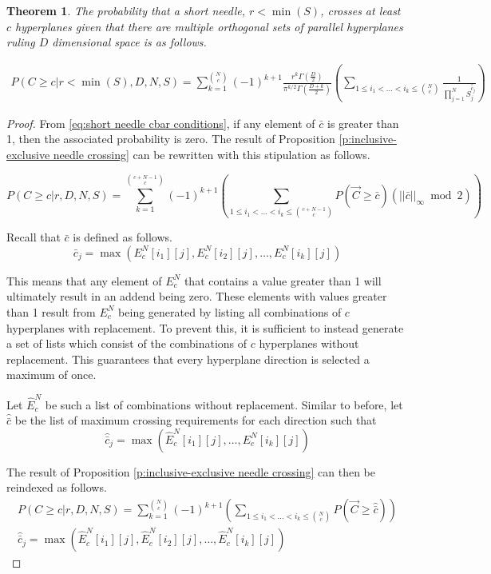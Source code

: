 \documentclass{article}
\newtheorem{theorem}{Theorem}
\begin{document}
\begin{theorem}
	The probability that a short needle, $r<\min(S)$, crosses at least $c$ hyperplanes given that there are 
	multiple orthogonal sets of parallel hyperplanes ruling $D$ dimensional space is as follows.

	\begin{gather}
		P(C\ge c|r<\min(S), D, N, S) = \sum_{k=1}^{N\choose c} (-1)^{k+1} \frac{r^k\Gamma(\frac{D}{2})}{\pi^{k/2}\Gamma(\frac{D+k}{2})} \left(\sum_{1\le i_1 < \hdots < i_k \le {N\choose c}}\frac{1}{\prod_{j=1}^N S_j^{\hat{\bar{c}}_j}} \right)
	\end{gather}
\end{theorem}
\begin{proof}
	From \ref{eq:short needle cbar conditions}, if any element of $\bar{c}$ is greater than 1, then the associated
	probability is zero. The result of Proposition \ref{p:inclusive-exclusive needle crossing} can be rewritten 
	with this stipulation as follows.

	\begin{equation}
		P(C\ge c|r,D,N,S) = \sum_{k=1}^{c+N-1\choose c} (-1)^{k+1}\left(\sum_{1\le i_1 < \hdots < i_k \le {c+N-1\choose c}}P(\vec{C}\ge\bar{c})(||\bar{c}||_\infty\bmod 2) \right)
	\end{equation}

	Recall that $\bar{c}$ is defined as follows.
	\begin{equation}
		\bar{c}_j = \max(E_c^N[i_1][j], E_c^N[i_2][j], \hdots, E_c^N[i_k][j])
	\end{equation}
	 
	This means that any element of $E_c^N$ that contains a value greater than 1 will ultimately 
	result in an addend being zero. These elements with values greater than 1 result from $E_c^N$
	being generated by listing all combinations of $c$ hyperplanes with replacement. To prevent this, it is sufficient to instead
	generate a set of lists which consist of the combinations of $c$ hyperplanes without replacement.
	This guarantees that every hyperplane direction is selected a maximum of once.
	
	Let $\hat{E}_c^N$ be such a list of combinations without replacement. Similar to before, let $\hat{\bar{c}}$
	be the list of maximum crossing requirements for each direction such that
	\begin{equation}
		\hat{\bar{c}}_j = \max(\hat{E}_c^N[i_1][j], \hdots, E_c^N[i_k][j])
	\end{equation}

	The result of Proposition \ref{p:inclusive-exclusive needle crossing} can then be reindexed as follows.
	\begin{gather}
		P(C\ge c|r,D,N,S) = \sum_{k=1}^{N\choose c} (-1)^{k+1}\left(\sum_{1\le i_1 < \hdots < i_k \le {N\choose c}}P(\vec{C}\ge\hat{\bar{c}}) \right) \label{eq:combo probs short needle} \\
		\hat{\bar{c}}_j = \max(\hat{E}_c^N[i_1][j], \hat{E}_c^N[i_2][j], \hdots, \hat{E}_c^N[i_k][j])
	\end{gather}


\end{proof}
\end{document}
